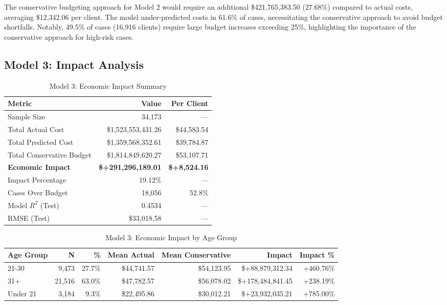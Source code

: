 The conservative budgeting approach for Model 2 would require an additional \$421,765,383.50 (27.68\%) compared to actual costs, averaging \$12,342.06 per client. The model under-predicted costs in 61.6\% of cases, necessitating the conservative approach to avoid budget shortfalls. Notably, 49.5\% of cases (16,916 clients) require large budget increases exceeding 25\%, highlighting the importance of the conservative approach for high-risk cases. 

\clearpage

\subsection{Model 3: Impact Analysis}
\label{subsec:model3_impact}

\begin{table}[htbp]
\centering
\small
\caption{Model 3: Economic Impact Summary}
\label{tab:model3_impact_summary}
\begin{tabular}{lrr}
\toprule
\textbf{Metric} & \textbf{Value} & \textbf{Per Client} \\
\midrule
Sample Size & 34,173 & --- \\
\midrule
Total Actual Cost & \$1,523,553,431.26 & \$44,583.54 \\
Total Predicted Cost & \$1,359,568,352.61 & \$39,784.87 \\
Total Conservative Budget & \$1,814,849,620.27 & \$53,107.71 \\
\midrule
\textbf{Economic Impact} & \textbf{\$+291,296,189.01} & \textbf{\$+8,524.16} \\
Impact Percentage & 19.12\% & --- \\
\midrule
Cases Over Budget & 18,056 & 52.8\% \\
\midrule
Model $R^2$ (Test) & 0.4534 & --- \\
RMSE (Test) & \$33,018.58 & --- \\
\bottomrule
\end{tabular}
\end{table}

\begin{table}[htbp]
\centering
\small
\caption{Model 3: Economic Impact by Age Group}
\label{tab:model3_impact_age}
\begin{tabular}{lrrrrrr}
\toprule
\textbf{Age Group} & \textbf{N} & \textbf{\%} & \textbf{Mean Actual} & \textbf{Mean Conservative} & \textbf{Impact} & \textbf{Impact \%} \\
\midrule
21-30 & 9,473 & 27.7\% & \$44,741.57 & \$54,123.95 & \$+88,879,312.34 & +460.76\% \\
31+ & 21,516 & 63.0\% & \$47,782.57 & \$56,078.02 & \$+178,484,841.45 & +238.19\% \\
Under 21 & 3,184 & 9.3\% & \$22,495.86 & \$30,012.21 & \$+23,932,035.21 & +785.00\% \\
\bottomrule
\end{tabular}
\end{table}

